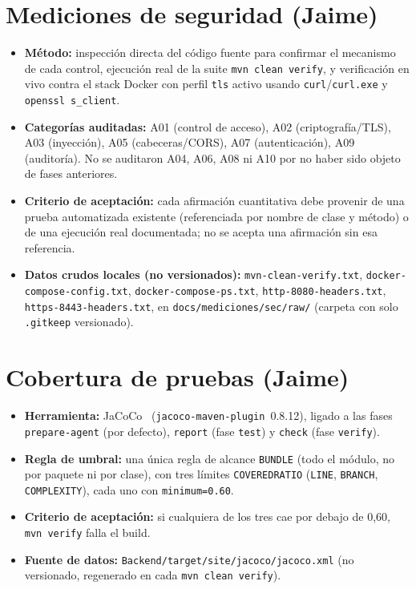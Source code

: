 \section{Mediciones de seguridad (Jaime)}

\begin{itemize}[nosep]
  \item \textbf{M\'etodo:} inspecci\'on directa del c\'odigo fuente para
    confirmar el mecanismo de cada control, ejecuci\'on real de la suite
    \texttt{mvn clean verify}, y verificaci\'on en vivo contra el stack
    Docker con perfil \texttt{tls} activo usando \texttt{curl}/\texttt{curl.exe}
    y \texttt{openssl s\_client}.
  \item \textbf{Categor\'ias auditadas:} A01 (control de acceso), A02
    (criptograf\'ia/TLS), A03 (inyecci\'on), A05 (cabeceras/CORS), A07
    (autenticaci\'on), A09 (auditor\'ia). No se auditaron A04, A06, A08 ni
    A10 por no haber sido objeto de fases anteriores.
  \item \textbf{Criterio de aceptaci\'on:} cada afirmaci\'on cuantitativa
    debe provenir de una prueba automatizada existente (referenciada por
    nombre de clase y m\'etodo) o de una ejecuci\'on real documentada; no se
    acepta una afirmaci\'on sin esa referencia.
  \item \textbf{Datos crudos locales (no versionados):} \texttt{mvn-clean-verify.txt},
    \texttt{docker-compose-config.txt}, \texttt{docker-compose-ps.txt},
    \texttt{http-8080-headers.txt}, \texttt{https-8443-headers.txt}, en
    \texttt{docs/mediciones/sec/raw/} (carpeta con solo \texttt{.gitkeep}
    versionado).
\end{itemize}

\section{Cobertura de pruebas (Jaime)}

\begin{itemize}[nosep]
  \item \textbf{Herramienta:} JaCoCo~\cite{jacoco-docs}
    (\texttt{jacoco-maven-plugin}~0.8.12), ligado a
    las fases \texttt{prepare-agent} (por defecto), \texttt{report} (fase
    \texttt{test}) y \texttt{check} (fase \texttt{verify}).
  \item \textbf{Regla de umbral:} una \'unica regla de alcance
    \texttt{BUNDLE} (todo el m\'odulo, no por paquete ni por clase), con
    tres l\'imites \texttt{COVEREDRATIO} (\texttt{LINE}, \texttt{BRANCH},
    \texttt{COMPLEXITY}), cada uno con \texttt{minimum=0.60}.
  \item \textbf{Criterio de aceptaci\'on:} si cualquiera de los tres cae
    por debajo de 0{,}60, \texttt{mvn verify} falla el build.
  \item \textbf{Fuente de datos:} \texttt{Backend/target/site/jacoco/jacoco.xml}
    (no versionado, regenerado en cada \texttt{mvn clean verify}).
\end{itemize}

